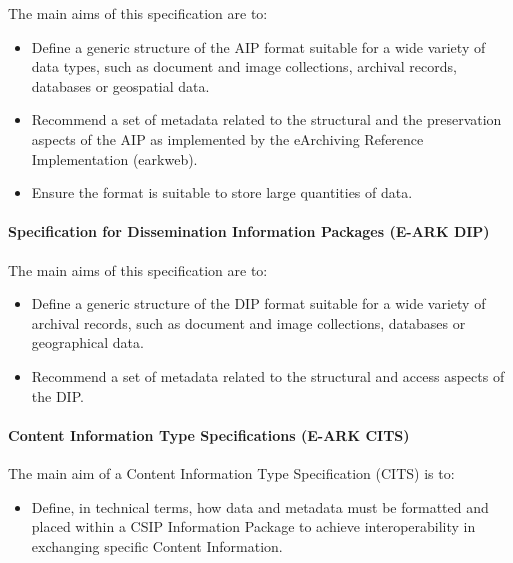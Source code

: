 The main aims of this specification are to:

\begin{itemize}
\tightlist
\item
  Define a generic structure of the AIP format suitable for a wide
  variety of data types, such as document and image collections,
  archival records, databases or geospatial data.
\item
  Recommend a set of metadata related to the structural and the
  preservation aspects of the AIP as implemented by the eArchiving
  Reference Implementation (earkweb).
\item
  Ensure the format is suitable to store large quantities of data.
\end{itemize}

\hypertarget{specification-for-dissemination-information-packages-e-ark-dip}{%
\paragraph{Specification for Dissemination Information Packages (E-ARK
DIP)}\label{specification-for-dissemination-information-packages-e-ark-dip}}

The main aims of this specification are to:

\begin{itemize}
\tightlist
\item
  Define a generic structure of the DIP format suitable for a wide
  variety of archival records, such as document and image collections,
  databases or geographical data.
\item
  Recommend a set of metadata related to the structural and access
  aspects of the DIP.
\end{itemize}

\hypertarget{content-information-type-specifications-e-ark-cits}{%
\paragraph{Content Information Type Specifications (E-ARK
CITS)}\label{content-information-type-specifications-e-ark-cits}}

The main aim of a Content Information Type Specification (CITS) is to:

\begin{itemize}
\tightlist
\item
  Define, in technical terms, how data and metadata must be formatted
  and placed within a CSIP Information Package to achieve
  interoperability in exchanging specific Content Information.
\end{itemize}

